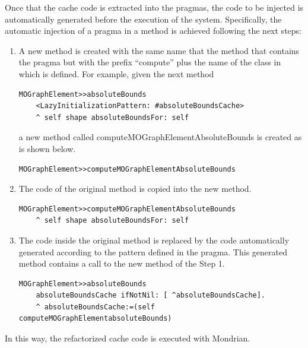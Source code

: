 \documentclass[preprint,10pt]{sigplanconf}
\begin{document}
Once that the cache code is extracted into the pragmas, the code to
be injected is automatically generated before the execution of the
system. Specifically, the automatic injection of a pragma in a method
is achieved following the next steps: 
\begin{enumerate}
\item A new method is created with the same name that the method that contains
the pragma but with the prefix {}``compute'' plus the name of the
class in which is defined. For example, given the next method
\begin{lstlisting} 
MOGraphElement>>absoluteBounds
	<LazyInitializationPattern: #absoluteBoundsCache> 
	^ self shape absoluteBoundsFor: self
\end{lstlisting}
a new method called computeMOGraphElementAbsoluteBounds is created as is shown below.
\begin{lstlisting} 
MOGraphElement>>computeMOGraphElementAbsoluteBounds
\end{lstlisting}
\item The code of the original method is copied into the new method.
\begin{lstlisting} 
MOGraphElement>>computeMOGraphElementAbsoluteBounds
	^ self shape absoluteBoundsFor: self
\end{lstlisting}
\item The code inside the original method is replaced by the code automatically
generated according to the pattern defined in the pragma. This generated
method contains a call to the new method of the Step 1.
\begin{lstlisting} 
MOGraphElement>>absoluteBounds
	absoluteBoundsCache ifNotNil: [ ^absoluteBoundsCache].
	^ absoluteBoundsCache:=(self computeMOGraphElementabsoluteBounds)
\end{lstlisting}
\end{enumerate}
In this way, the refactorized cache code is executed with Mondrian.
\end{document}
